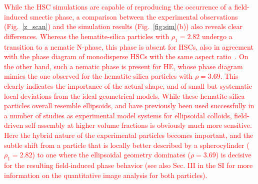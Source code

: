 \documentclass[aps,prl,preprint,superscriptaddress]{revtex4-1} %
\begin{document}
\textcolor{red}{While the HSC simulations are capable of reproducing the occurrence of a field-induced smectic phase, a
  comparison between the experimental observations (Fig.~\ref{z_scan}) and the simulation results
  (Fig.~\ref{fig:sim}(b)) also reveals clear differences. Whereas the hematite-silica particles with $\rho_1=2.82$
  undergo a transition to a nematic N-phase, this phase is absent for HSCs, also in agreement with the phase diagram of
  monodisperse HSCs with the same aspect ratio~\cite{Bolhuis1997}. On the other hand, such a nematic phase is present
  for {\color{green}HE}, whose phase diagram mimics the one observed for the hematite-silica particles with $\rho=3.69$. This clearly
  indicates the importance of the actual shape, and of small but systematic local deviations from the ideal geometrical
  models. While these hematite-silica particles overall resemble ellipsoids, and have previously been used successfully
  in a number of studies as experimental model systems for ellipsoidal colloids, field-driven self assembly at higher
  volume fractions is obviously much more sensitive. Here the hybrid nature of the experimental particles becomes
  important, and the subtle shift from a particle that is locally better described by a spherocylinder ($\rho_1=2.82$)
  to one where the ellipsoidal geometry dominates ($ \rho=3.69$) is decisive for the resulting field-induced phase
behavior (see also Sec. III in the SI for more information on the quantitative image analysis for both particles).}
\end{document}
